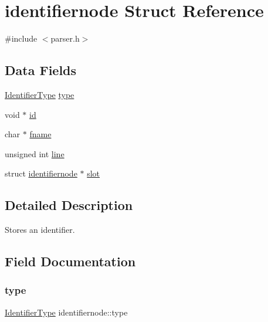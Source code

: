 \hypertarget{structidentifiernode}{}\section{identifiernode Struct Reference}
\label{structidentifiernode}


{\ttfamily \#include $<$parser.\+h$>$}

\subsection*{Data Fields}
\begin{DoxyCompactItemize}
\item 
\hyperlink{parser_8h_a7ddfda537ff35a65ab6f7b9e9b596b62}{Identifier\+Type} \hyperlink{structidentifiernode_af02e1bf04f4d46af404227d9f7761a2e}{type}
\item 
void $\ast$ \hyperlink{structidentifiernode_a729df89140813a04c3f31e1f7087628a}{id}
\item 
char $\ast$ \hyperlink{structidentifiernode_a45fcf75373defb65130557413dedec2d}{fname}
\item 
unsigned int \hyperlink{structidentifiernode_a6da5e6724ff8e4ffeeda6d56f6a64168}{line}
\item 
struct \hyperlink{structidentifiernode}{identifiernode} $\ast$ \hyperlink{structidentifiernode_a6093288822da9ec5ff1f3287927c99ad}{slot}
\end{DoxyCompactItemize}


\subsection{Detailed Description}
Stores an identifier. 

\subsection{Field Documentation}
\mbox{\label{structidentifiernode_af02e1bf04f4d46af404227d9f7761a2e}} 
\subsubsection{\texorpdfstring{type}{type}}
{\footnotesize\ttfamily \hyperlink{parser_8h_a7ddfda537ff35a65ab6f7b9e9b596b62}{Identifier\+Type} identifiernode\+::type}

